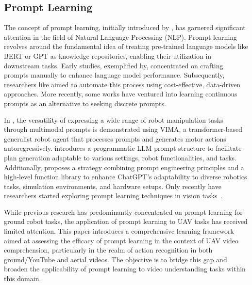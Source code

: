 \documentclass[letterpaper, 10 pt, conference]{ieeeconf}
\begin{document}
\subsection{Prompt Learning}
The concept of prompt learning, initially introduced by \cite{petroni2019language}, has garnered significant attention in the field of Natural Language Processing (NLP)\cite{brown2020language,jiang2020can,Li2021PrefixTuningOC,liu2023pre,tian2020rethinking}. Prompt learning revolves around the fundamental idea of treating pre-trained language models like BERT or GPT as knowledge repositories, enabling their utilization in downstream tasks. Early studies, exemplified by\cite{petroni2019language,Poerner2019EBERTEE}, concentrated on crafting prompts manually to enhance language model performance. Subsequently, researchers like \cite{Shin2020ElicitingKF,jiang2020can} aimed to automate this process using cost-effective, data-driven approaches. More recently, some works\cite{han2022ptr,lester2021power,zhong2021factual} have ventured into learning continuous prompts as an alternative to seeking discrete prompts.



In \cite{jiang2022vima}, the versatility of expressing a wide range of robot manipulation tasks through multimodal prompts is demonstrated using VIMA, a transformer-based generalist robot agent that processes prompts and generates motor actions autoregressively. \cite{singh2023progprompt} introduces a programmatic LLM prompt structure to facilitate plan generation adaptable to various settings, robot functionalities, and tasks. Additionally, \cite{vemprala2023chatgpt} proposes a strategy combining prompt engineering principles and a high-level function library to enhance ChatGPT's adaptability to diverse robotics tasks, simulation environments, and hardware setups. Only recently have researchers started exploring prompt learning techniques in vision tasks~\cite{rao2022denseclip,ju2022prompting,Zhou2021LearningTP}. 

While previous research has predominantly concentrated on prompt learning for ground robot tasks, the application of prompt learning to UAV tasks has received limited attention. This paper introduces a comprehensive learning framework aimed at assessing the efficacy of prompt learning in the context of UAV video comprehension, particularly in the realm of action recognition in both ground/YouTube and aerial videos. The objective is to bridge this gap and broaden the applicability of prompt learning to video understanding tasks within this domain.
\end{document}
